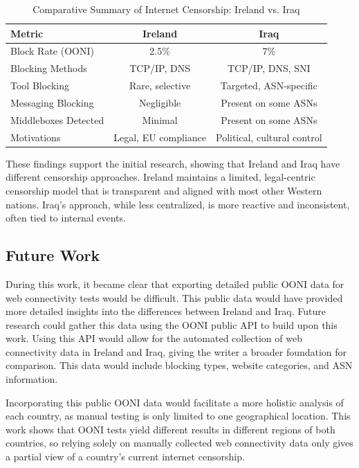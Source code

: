 \begin{table}[H]
\centering
\caption{Comparative Summary of Internet Censorship: Ireland vs. Iraq}
\begin{tabular}{lcc}
\toprule
\textbf{Metric} & \textbf{Ireland} & \textbf{Iraq} \\
\midrule
Block Rate (OONI) & 2.5\% & 7\% \\
Blocking Methods & TCP/IP, DNS & TCP/IP, DNS, SNI \\
Tool Blocking & Rare, selective & Targeted, ASN-specific \\
Messaging Blocking & Negligible & Present on some ASNs \\
Middleboxes Detected & Minimal & Present on some ASNs \\
Motivations & Legal, EU compliance & Political, cultural control \\
\bottomrule
\end{tabular}
\label{tab:comparison_summary}
\end{table}

These findings support the initial research, showing that Ireland and Iraq have different censorship approaches. Ireland maintains a limited, legal-centric censorship model that is transparent and aligned with most other Western nations. Iraq's approach, while less centralized, is more reactive and inconsistent, often tied to internal events. 

\subsection{Future Work}

During this work, it became clear that exporting detailed public OONI data for web connectivity tests would be difficult. This public data would have provided more detailed insights into the differences between Ireland and Iraq. Future research could gather this data using the OONI public API to build upon this work. Using this API would allow for the automated collection of web connectivity data in Ireland and Iraq, giving the writer a broader foundation for comparison. This data would include blocking types, website categories, and ASN information.

Incorporating this public OONI data would facilitate a more holistic analysis of each country, as manual testing is only limited to one geographical location. This work shows that OONI tests yield different results in different regions of both countries, so relying solely on manually collected web connectivity data only gives a partial view of a country's current internet censorship. 